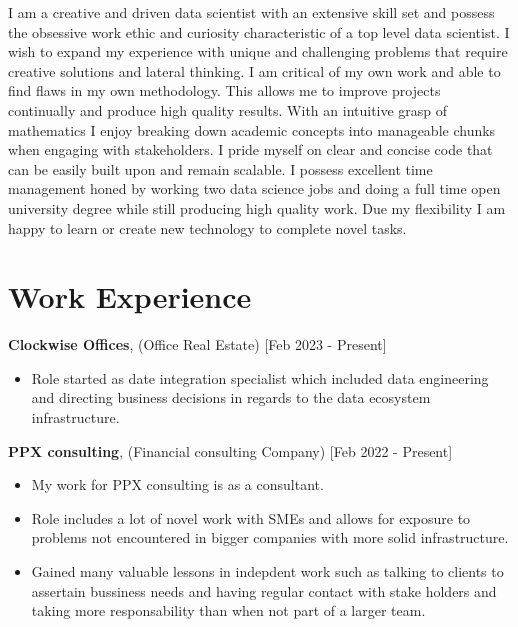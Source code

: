 \documentclass[10pt]{article}
\begin{document}
{I am a creative and driven data scientist with an extensive skill set and possess the obsessive work ethic and curiosity characteristic of a top level data scientist.
I wish to expand my experience with unique and challenging problems that require creative solutions
and lateral thinking.
\newline
I am critical of my own work and able to find flaws in my own methodology. This allows me to
improve projects continually and produce high quality results.
With an intuitive grasp of mathematics I enjoy breaking down academic concepts into manageable chunks when engaging with stakeholders.
\newline
I pride myself on clear and concise code that can be easily built upon and remain scalable.
\newline
I possess excellent time management honed by working two data science jobs and doing a full time open
university degree while still producing high quality work.
Due my flexibility I am happy to learn or create new technology to complete novel tasks.





\section*{\bf Work Experience}

{\bf Clockwise Offices}, (Office Real Estate) [Feb 2023 - Present]
\begin{itemize}
\setlength{\itemsep}{0.10ex}
\item Role started as date integration specialist which included data engineering and directing business decisions in regards to the data ecosystem infrastructure.

\end{itemize}

{\bf PPX consulting}, (Financial consulting Company) [Feb 2022 - Present]
\begin{itemize}
\setlength{\itemsep}{0.10ex}
\item My work for PPX consulting is as a consultant.
\item Role includes a lot of novel work with SMEs and allows for exposure to problems not encountered in bigger companies with more solid infrastructure.
\item Gained many valuable lessons in indepdent work such as talking to clients to assertain
bussiness needs and having regular contact with stake holders and taking more responsability than when not part of a larger team.


\end{itemize}}
\end{document}
